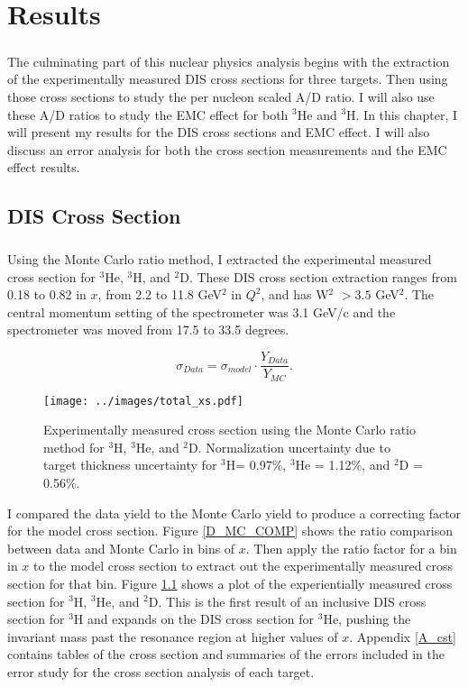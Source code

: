 
\chapter{Results}
\paragraph{}The culminating part of this nuclear physics analysis begins with the extraction of the experimentally measured DIS cross sections for three targets. Then using those cross sections to study the per nucleon scaled A/D ratio. I will also use these A/D ratios to study the EMC effect for both $^3$He and $^3$H. In this chapter, I will present my results for the DIS cross sections and EMC effect. I will also discuss an error analysis for both the cross section measurements and the EMC effect results. 
\section{DIS Cross Section}
\paragraph{}Using the Monte Carlo ratio method, I extracted the experimental measured cross section for $^3$He, $^3$H, and $^2$D. These DIS cross section extraction ranges from 0.18 to 0.82 in $x$, from 2.2 to 11.8 GeV$^2$ in $Q^2$, and has W$^2$ $>3.5$ GeV$^2$. The central momentum setting of the spectrometer was 3.1 GeV/c and the spectrometer was moved from 17.5 to 33.5 degrees.


\begin{equation}
\sigma_{Data} = \sigma_{model} \cdot \frac{Y_{Data}}{Y_{MC}}. \nonumber
\end{equation}
\begin{figure}
	\hspace{-20pt}
	\texttt{[image: ../images/total\_xs.pdf]}
	\caption{Experimentally measured cross section using the Monte Carlo ratio method for $^3$H, $^3$He, and $^2$D. Normalization uncertainty due to target thickness uncertainty for $^3$H= 0.97\%, $^3$He = 1.12\%, and $^2$D = 0.56\%.}
    \label{CCplot}
\end{figure}
I compared the data yield to the Monte Carlo yield to produce a correcting factor for the model cross section. Figure \ref{D_MC_COMP} shows the ratio comparison between data and Monte Carlo in bins of $x$. Then apply the ratio factor for a bin in $x$ to the model cross section to extract out the experimentally measured cross section for that bin. Figure \ref{CCplot} shows a plot of the experientially measured cross section for $^3$H, $^3$He, and $^2$D.  This is the first result of an inclusive DIS cross section for $^3$H and expands on the DIS cross section for $^3$He, pushing the invariant mass past the resonance region at higher values of $x$.  Appendix \ref{A_cst} contains tables of the cross section and summaries of the errors included in the error study for the cross section analysis of each target. 
